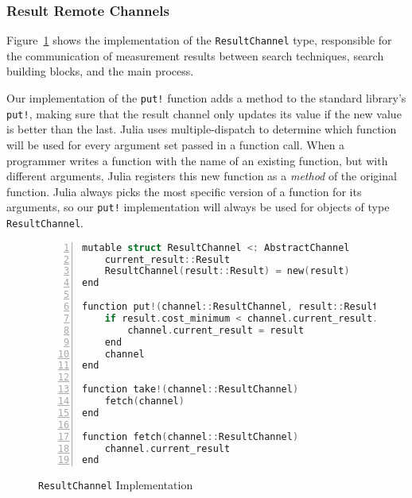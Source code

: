 \subsubsection{Result Remote Channels}

Figure~\ref{fig:nodal-resultchannel} shows the implementation of the
\texttt{ResultChannel} type, responsible for the communication of measurement
results between search techniques, search building blocks, and the main
process.

Our implementation of the \texttt{put!} function adds a method to the standard
library's \texttt{put!}, making sure that the result channel only updates its
value if the new value is better than the last.  Julia uses multiple-dispatch
to determine which function will be used for every argument set passed in a
function call.  When a programmer writes a function with the name of
an existing function, but with different arguments, Julia registers this new
function as a \textit{method} of the original function. Julia always
picks the most specific version of a function for its arguments, so our
\texttt{put!} implementation will always be used for objects of type
\texttt{ResultChannel}.

\begin{figure}[htpb]
    \begin{minipage}{\linewidth}
    \begin{lstlisting}[language=C, basicstyle=\ttfamily\scriptsize,
        numbers=left,
        frame=no, showspaces=false, showstringspaces=false,
        numberstyle=\scriptsize,
        xleftmargin=1.5cm,
        keywords={%
            @spawnat, remotecall, Nullable, Any,
            @fetch, Future, Array, Float64, julia,
            while, true, function, end, put!,
            take!, sleep, RemoteChannel, Channel,
            Int, Tuple, const, addprocs, @schedule,
            @everywhere, for, in, myid, @async,
            remote_do, workers, Result, Real,
            AbstractFloat, deepcopy, rand, exp, true,
            Function, false, Run, mutable, struct,
            ResultChannel, AbstractChannel, return%
        },
        otherkeywords={::, \&, \*, +, -, /, [, ], >, <, put!, take!, neighbor!,
                       update!}
    ]
mutable struct ResultChannel <: AbstractChannel
    current_result::Result
    ResultChannel(result::Result) = new(result)
end

function put!(channel::ResultChannel, result::Result)
    if result.cost_minimum < channel.current_result.cost_minimum
        channel.current_result = result
    end
    channel
end

function take!(channel::ResultChannel)
    fetch(channel)
end

function fetch(channel::ResultChannel)
    channel.current_result
end
    \end{lstlisting}
    \end{minipage}
    \caption{\texttt{ResultChannel} Implementation}
    \label{fig:nodal-resultchannel}
\end{figure}

